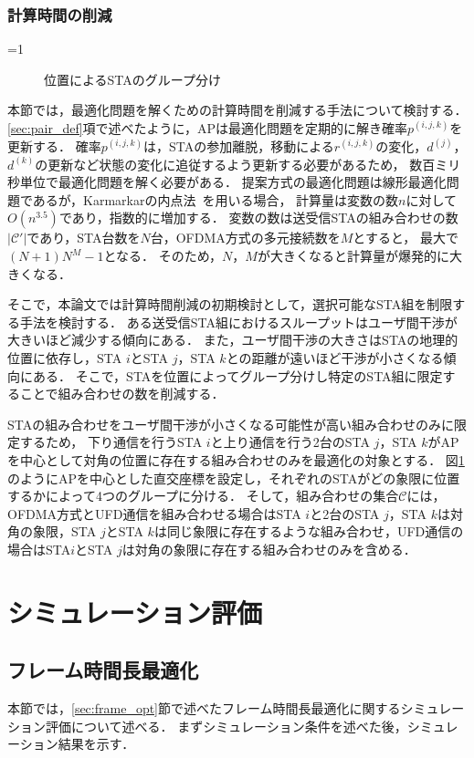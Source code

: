 \documentclass[master]{kuisthesis}		%
\newcommand{\pijk}{p^{(i,j,k)}}
\newcommand{\rijk}{r^{(i,j,k)}}
\newcommand{\mthc}{\mathcal C}
\newcommand{\mthcd}{{\mathcal C}'}
\newcounter{flagFig}
\begin{document}
		\subsubsection{計算時間の削減}\label{sec:time}
			\ifnum\value{flagFig}=1 {\begin{figure}[htbp]
				\centering
				\caption{位置によるSTAのグループ分け}
				\label{fig:time_image}
			\end{figure}}\fi
			本節では，最適化問題を解くための計算時間を削減する手法について検討する．
			\ref{sec:pair_def}項で述べたように，APは最適化問題を定期的に解き確率$\pijk$を更新する．
			確率$\pijk$は，STAの参加離脱，移動による$\rijk$の変化，$d^{(j)}$，$d^{(k)}$の更新など状態の変化に追従するよう更新する必要があるため，
			数百ミリ秒単位で最適化問題を解く必要がある．
			提案方式の最適化問題は線形最適化問題であるが，Karmarkarの内点法~\cite{karmarkar}を用いる場合，
			計算量は変数の数$n$に対して$O(n^{3.5})$であり，指数的に増加する．
			変数の数は送受信STAの組み合わせの数$|{\mthcd}|$であり，STA台数を$N$台，OFDMA方式の多元接続数を$M$とすると，
			最大で$(N+1)N^M-1$となる．
			そのため，$N$，$M$が大きくなると計算量が爆発的に大きくなる．
			\par
			そこで，本論文では計算時間削減の初期検討として，選択可能なSTA組を制限する手法を検討する．
			ある送受信STA組におけるスループットはユーザ間干渉が大きいほど減少する傾向にある．
			また，ユーザ間干渉の大きさはSTAの地理的位置に依存し，STA $i$とSTA $j$，STA $k$との距離が遠いほど干渉が小さくなる傾向にある．
			そこで，STAを位置によってグループ分けし特定のSTA組に限定することで組み合わせの数を削減する．
			\par
			STAの組み合わせをユーザ間干渉が小さくなる可能性が高い組み合わせのみに限定するため，
			下り通信を行うSTA $i$と上り通信を行う2台のSTA $j$，STA $k$がAPを中心として対角の位置に存在する組み合わせのみを最適化の対象とする．
			図\ref{fig:time_image}のようにAPを中心とした直交座標を設定し，それぞれのSTAがどの象限に位置するかによって4つのグループに分ける．
			そして，組み合わせの集合$\mthc$には，OFDMA方式とUFD通信を組み合わせる場合はSTA $i$と2台のSTA $j$，STA $k$は対角の象限，STA $j$とSTA $k$は同じ象限に存在するような組み合わせ，UFD通信の場合はSTA$i$とSTA $j$は対角の象限に存在する組み合わせのみを含める．

\section{シミュレーション評価}
	\subsection{フレーム時間長最適化}
		本節では，\ref{sec:frame_opt}節で述べたフレーム時間長最適化に関するシミュレーション評価について述べる．
		まずシミュレーション条件を述べた後，シミュレーション結果を示す．
\end{document}
